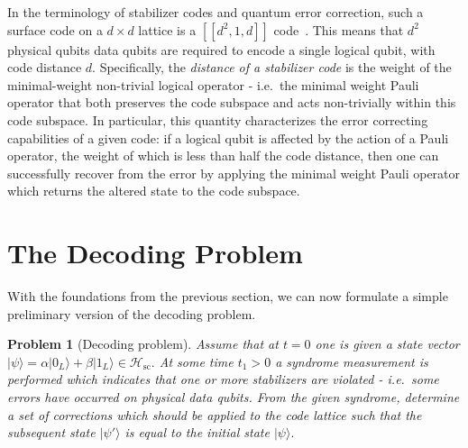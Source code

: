 \documentclass[twocolumn,preprintnumbers,amsmath,amssymb,notitlepage,nofootinbib,longbibliography,superscriptaddress,aps,pra,10pt]{revtex4-1}
\newtheorem{problem}{Problem}%
\begin{document}
	In the terminology of stabilizer codes and quantum error correction,  such a surface code on a $d\times d$ lattice is a 
	$[[d^2,1,d]]$ code~\cite{Gottesman97}.
	This means that $d^2$ physical qubits data qubits are required to encode a single logical qubit, with code distance $d$.
	Specifically, the \emph{distance of a stabilizer code} is the weight of the minimal-weight non-trivial logical operator - i.e.\ the minimal weight Pauli operator that both preserves the code subspace and acts non-trivially within this code subspace.
	In particular, this quantity characterizes the error correcting capabilities of a given code: if a logical qubit is affected by the action of a Pauli operator, the weight of which is less than half the code distance, then one can successfully recover from the error by applying the minimal weight Pauli operator which returns the altered state to the code subspace.

\section{The Decoding Problem}\label{s:the_decoding_problem}

	With the foundations from the previous section, we can now formulate a simple preliminary version of the decoding problem.

	\begin{problem}[Decoding problem]Assume that at $t=0$ one is given a state vector $|\psi\rangle = \alpha |0_L\rangle + \beta |1_L\rangle \in \mathcal{H}_{\mathrm{sc}}.$ \textit{At some time }$t_1>0$ \textit{a syndrome measurement is performed which indicates that one or more stabilizers are violated - i.e.\ some errors have occurred on physical data qubits.
	From the given syndrome, determine a set of corrections which should be applied to the code lattice such that the subsequent state} $|\psi'\rangle$ \textit{is equal to the initial state} $|\psi\rangle.$ 
	\end{problem}
	
\end{document}
